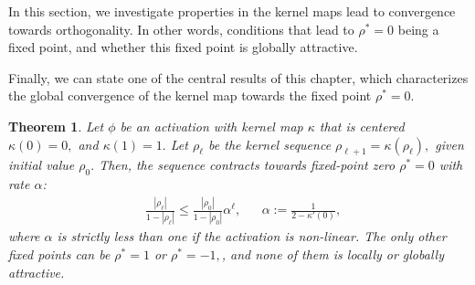 \documentclass[twoside]{article}
\newtheorem{theorem}{Theorem}
\newtheorem{remark}{Remark}
\theoremstyle{definition}
\newtheorem{definition}{Definition}
\begin{document}
In this section, we investigate properties in the kernel maps lead to convergence towards orthogonality. In other words, conditions that lead to $\rho^*=0$ being a fixed point, and whether this fixed point is globally attractive. 








Finally, we can state one of the central results of this chapter, which characterizes the global convergence of the kernel map towards the fixed point $\rho^*=0.$

\begin{theorem}\label{thm:global_attract}
Let $\phi$ be an activation with kernel map $\kappa$ that is centered $\kappa(0)=0,$ and $\kappa(1)=1.$ Let $\rho_\ell$ be the kernel sequence $\rho_{\ell+1}=\kappa(\rho_\ell),$ given initial value $\rho_0.$ Then, the sequence contracts towards fixed-point zero $\rho^*=0$ with rate $\alpha$:
    \begin{align}
        &\frac{|\rho_\ell|}{1-|\rho_\ell|} \le \frac{|\rho_0|}{1-|\rho_0|}\alpha^{\ell}, && \alpha := \frac{1}{2-\kappa'(0)},
    \end{align}
 where $\alpha$ is strictly less than one if the activation is non-linear. The only other fixed points can be $\rho^*=1$ or $\rho^*=-1,$, and none of them is locally or globally attractive.
\end{theorem}
\end{document}
